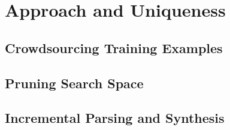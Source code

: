 \section{Approach and Uniqueness}
\subsection{Crowdsourcing Training Examples}
\subsection{Pruning Search Space}
\subsection{Incremental Parsing and Synthesis}